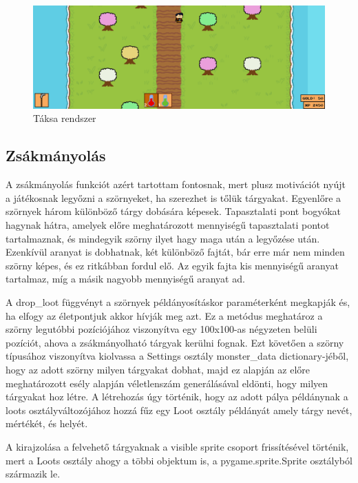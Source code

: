 \begin{figure}[H]
    \centering
    \includegraphics[width=15.5truecm]{images/inventory.png}
    \caption{Táksa rendszer \cite{backpack}}
    \label{fig:Táska rendszer}
\end{figure}

\subsection{Zsákmányolás}

\indent \indent A zsákmányolás funkciót azért tartottam fontosnak, mert plusz motivációt nyújt a játékosnak legyőzni a szörnyeket, ha szerezhet is tőlük tárgyakat. Egyenlőre a szörnyek három különböző tárgy dobására képesek. Tapasztalati pont bogyókat hagynak hátra, amelyek előre meghatározott mennyiségű tapasztalati pontot tartalmaznak, és mindegyik szörny ilyet hagy maga után a legyőzése után. Ezenkívül aranyat is dobhatnak, két különböző fajtát, bár erre már nem minden szörny képes, és ez ritkábban fordul elő. Az egyik fajta kis mennyiségű aranyat tartalmaz, míg a másik nagyobb mennyiségű aranyat ad. 

A drop\_loot függvényt a szörnyek példányosításkor paraméterként megkapják és, ha elfogy az életpontjuk akkor hívják meg azt. Ez a metódus meghatároz a szörny legutóbbi pozíciójához viszonyítva egy 100x100-as négyzeten belüli pozíciót, ahova a zsákmányolható tárgyak kerülni fognak. Ezt követően a szörny típusához viszonyítva kiolvassa a Settings osztály monster\_data dictionary-jéből, hogy az adott szörny milyen tárgyakat dobhat, majd ez alapján az előre meghatározott esély alapján véletlenszám generálásával eldönti, hogy milyen tárgyakat hoz létre. A létrehozás úgy történik, hogy az adott pálya példánynak a loots osztályváltozójához hozzá fűz egy Loot osztály példányát amely tárgy nevét, mértékét, és helyét.

A kirajzolása a felvehető tárgyaknak a visible sprite csoport frissítésével történik, mert a Loots osztály ahogy a többi objektum is, a pygame.sprite.Sprite osztályból származik le.  

